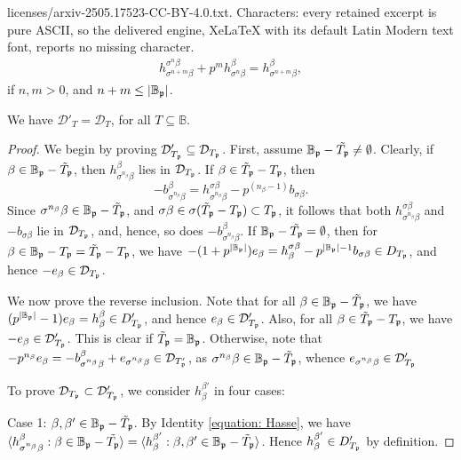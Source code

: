 \documentclass[10pt,a4paper]{amsart}
\def\BB{\mathbb{B}}
\newcommand{\calD}{{\mathcal{D}}}
\newcommand{\gerp}{{\frak{p}}}
\begin{document}
licenses/arxiv-2505.17523-CC-BY-4.0.txt. Characters: every retained excerpt is pure ASCII, so the delivered engine, XeLaTeX with its default Latin Modern text font, reports no missing character.
\begin{eqnarray}\label{equation: Hasse} h_{\sigma^{n+m}{\beta}}^{\sigma^n\beta} + p^m h_{\sigma^n\beta}^\beta =h_{\sigma^{n+m}\beta}^{\beta},\end{eqnarray} if $n,m>0$, and $n+m \leq |\BB_\gerp|$.  

\begin{prop} \label{prop: optimal} We have $\calD'_{T}=\calD_{T}$, for all $T \subseteq  \BB$.
\end{prop}

\begin{proof}  We begin by proving  $\calD'_{T_\gerp}\subseteq \calD_{T_\gerp}$. First, assume $\BB_\gerp-\tilde{T_\gerp}\neq \emptyset$. Clearly, if $\beta \in \BB_\gerp-\tilde{T}_\gerp$, then $h_{\sigma^{n_\beta}\beta}^\beta$ lies in $\calD_{T_\gerp}$. If $\beta \in \tilde{T}_\gerp-T_\gerp$, then 
\[
-b_{\sigma^{n_\beta}\beta}^\beta=h_{\sigma^{n_\beta}\beta}^{\sigma\beta}-p^{(n_\beta-1)}b_{\sigma\beta}.
\]
Since $\sigma^{n_\beta}\beta \in \BB_\gerp-\tilde{T}_\gerp$, and $\sigma\beta \in \sigma(\tilde{T}_\gerp-T_\gerp) \subset T_\gerp$, it follows that both $h_{\sigma^{n_\beta}\beta}^{\sigma\beta}$ and $-b_{\sigma\beta}$ lie in $\calD_{T_\gerp}$, and, hence, so does $-b_{\sigma^{n_\beta}\beta}^\beta$.  If $\BB_\gerp-\tilde{T_\gerp}=\emptyset$, then for $\beta \in \BB_\gerp-T_\gerp=\tilde{T}_\gerp-T_\gerp$, we have $-(1+p^{|\BB_\gerp|})e_\beta=h_\beta^{\sigma\beta}-{p^{|\BB_\gerp|-1}}b_{\sigma\beta} \in D_{T_\gerp}$, and hence $-e_\beta \in \calD_{T_\gerp}$.

We now prove the reverse inclusion. Note that for all $\beta \in \BB_\gerp-\tilde{T}_\gerp$, we have $(p^{|\BB_\gerp|}-1)e_\beta=h_\beta^\beta \in D'_{T_\gerp}$, and hence $e_\beta \in \calD'_{T_\gerp}$. Also, for all $\beta \in \tilde{T}_\gerp-T_\gerp $, we have $-e_\beta \in \calD'_{T_\gerp}$. This is clear if $\tilde{T}_\gerp=\BB_\gerp$. Otherwise, note that $-p^{n_\beta}e_\beta=-b_{\sigma^{n_\beta}\beta}^\beta+e_{\sigma^{n_\beta}\beta} \in \calD_{T'_\gerp}$, as $\sigma^{n_\beta}\beta\in \BB_\gerp-\tilde{T}_\gerp$, whence $e_{\sigma^{n_\beta}\beta} \in \calD'_{T_\gerp}$

To prove $\calD_{T_\gerp}\subset \calD'_{T_\gerp}$, we consider $h_{\beta}^{\beta'}$ in four cases:

\noindent Case 1: $\beta,\beta' \in \BB_\gerp-\tilde{T}_\gerp$. By Identity \ref{equation: Hasse}, we have 
$\langle h_{\sigma^{n_\beta}\beta}^{\beta}: \beta \in \BB_\gerp-\tilde{T_\gerp} \rangle = \langle h_\beta^{\beta'}: \beta,\beta' \in \BB_\gerp-\tilde{T}_\gerp\rangle$. Hence $h_\beta^{\beta'} \in D'_{T_\gerp}$ by definition.


\end{proof}
\end{document}
